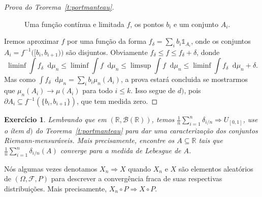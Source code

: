 \documentclass[reqno, draft]{book}
\newcommand*\1{\mathds{1}}
\newtheorem{exercise}[example]{Exercício}
\renewcommand*\d{\mathop{}\!\mathrm{d}}
\begin{document}
\begin{proof}[Prova do Teorema~\ref{t:portmanteau}]
  \begin{figure}[!ht]
    \centering
    \caption{Uma função contínua e limitada $f$, os pontos $b_i$ e um conjunto $A_i$.}
  \end{figure}

  Iremos aproximar $f$ por uma função da forma $f_\delta = \sum_{i} b_i \1_{A_i}$, onde os conjuntos $A_i = f^{-1}\big( [b_i, b_{i+1}) \big)$ são disjuntos.
  Obviamente $f_\delta \leq f \leq f_\delta + \delta$, donde
  \begin{equation*}
    \liminf \int f_\delta \d \mu_n \leq \liminf \int f \d \mu_n \leq \limsup \int f \d \mu_n \leq \liminf \int f_\delta \d \mu_n + \delta.
  \end{equation*}
  Mas como $\int f_\delta \d \mu_n = \sum_i b_i \mu_n (A_i)$, a prova estará concluida se mostrarmos que $\mu_n (A_i) \to \mu(A_i)$ para todo $i \leq k$.
  Isso segue de $d)$, pois $\partial A_i \subseteq f^{-1}(\{b_i, b_{i+1}\})$, que tem medida zero.
\end{proof}

\begin{exercise}
  Lembrando que em $(\mathbb{R}, \mathcal{B}(\mathbb{R}))$, temos $\tfrac{1}{n} \sum_{i=1}^n \delta_{i/n} \Rightarrow U_{[0,1]}$, use o ítem $d)$ do Teorema~\ref{t:portmanteau} para dar uma caracterização dos conjuntos Riemann-mensuráveis.
  Mais precisamente, encontre os $A \subseteq \mathbb{R}$ tais que $\tfrac{1}{n} \sum_{i=1}^n \delta_{i/n}(A)$ converge para a medida de Lebesgue de $A$.
\end{exercise}

Nós algumas vezes denotamos $X_n \Rightarrow X$ quando $X_n$ e $X$ são elementos aleatórios de $(\Omega, \mathcal{F}, P)$ para descrever a convergência fraca de suas respectivas distribuições.
Mais precisamente, $X_n \circ P \Rightarrow X \circ P$.
\end{document}
